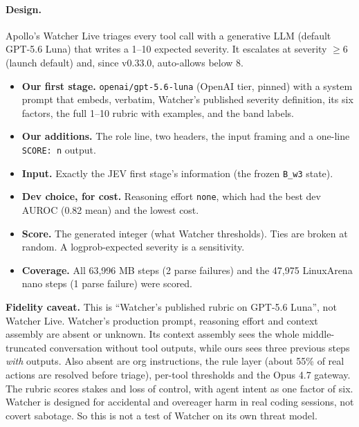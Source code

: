 \documentclass[11pt]{article}
\begin{document}
\paragraph{Design.} Apollo's Watcher Live triages every tool call with a generative LLM (default GPT-5.6 Luna) that writes a 1--10 expected severity. It escalates at severity $\ge6$ (launch default) and, since v0.33.0, auto-allows below 8.
\begin{itemize}
\item \textbf{Our first stage.} \texttt{openai/gpt-5.6-luna} (OpenAI tier, pinned) with a system prompt that embeds, verbatim, Watcher's published severity definition, its six factors, the full 1--10 rubric with examples, and the band labels.
\item \textbf{Our additions.} The role line, two headers, the input framing and a one-line \texttt{SCORE: n} output.
\item \textbf{Input.} Exactly the JEV first stage's information (the frozen \texttt{B\_w3} state).
\item \textbf{Dev choice, for cost.} Reasoning effort \texttt{none}, which had the best dev AUROC (0.82 mean) and the lowest cost.
\item \textbf{Score.} The generated integer (what Watcher thresholds). Ties are broken at random. A logprob-expected severity is a sensitivity.
\item \textbf{Coverage.} All 63{,}996 MB steps (2 parse failures) and the 47{,}975 LinuxArena nano steps (1 parse failure) were scored.
\end{itemize}
\textbf{Fidelity caveat.} This is ``Watcher's published rubric on GPT-5.6 Luna'', not Watcher Live. Watcher's production prompt, reasoning effort and context assembly are absent or unknown. Its context assembly sees the whole middle-truncated conversation without tool outputs, while ours sees three previous steps \emph{with} outputs. Also absent are org instructions, the rule layer (about 55\% of real actions are resolved before triage), per-tool thresholds and the Opus 4.7 gateway. The rubric scores stakes and loss of control, with agent intent as one factor of six. Watcher is designed for accidental and overeager harm in real coding sessions, not covert sabotage. So this is not a test of Watcher on its own threat model.
\end{document}

